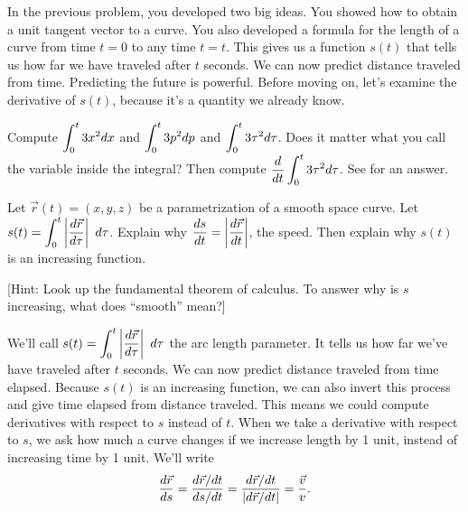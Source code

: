 In the previous problem, you developed two big ideas.  You showed how to obtain a unit tangent vector to a curve. You also developed a formula for the length of a curve from time $t=0$ to any time $t=t$.  This gives us a function $s(t)$ that tells us how far we have traveled after $t$ seconds. We can now predict distance traveled from time. Predicting the future is powerful. Before moving on, let's examine the derivative of $s(t)$, because it's a quantity we already know.

\begin{review*}
 Compute $\displaystyle \int_0^t 3x^2 dx$ and $\displaystyle \int_0^t 3p^2 dp$ and $\displaystyle \int_0^t 3\tau^2 d\tau$. 
 Does it matter what you call the variable inside the integral? 
 Then compute $\displaystyle\frac{d}{dt} \int_0^t 3\tau^2 d\tau$. See 
for an answer. 
\end{review*}


\begin{problem}\label{fundamental theorem of calculus as it applies to arc length parameter}%
 Let $\vec r(t)=(x,y,z)$ be a parametrization of a smooth space curve. Let $\displaystyle s(t)=\int_0^t \left|\frac {d\vec r}{d\tau} \right|\ d\tau$.  Explain why $\displaystyle\frac{ds}{dt} = \left|\frac {d\vec r}{dt} \right|$, the speed. Then explain why $s(t)$ is an increasing function.

 [Hint: Look up the fundamental theorem of calculus. To answer why is $s$ increasing, what does ``smooth'' mean?] 
\end{problem}

We'll call $\displaystyle s(t)=\int_0^t \left|\frac {d\vec r}{d\tau}\right|\ d\tau$ the arc length parameter.  It tells us how far we've have traveled after $t$ seconds. We can now predict distance traveled from time elapsed. Because $s(t)$ is an increasing function, we can also invert this process and give time elapsed from distance traveled. This means we could compute derivatives with respect to $s$ instead of $t$.  
When we take a derivative with respect to $s$, we ask how much a curve changes if we increase length by 1 unit, instead of increasing time by 1 unit.  We'll write
$$\displaystyle\frac{d\vec r}{ds} =\displaystyle\frac{d\vec r/dt}{ds/dt} = \frac{d\vec r/dt}{|d\vec r/dt|} = \frac{\vec v}{v}.$$


